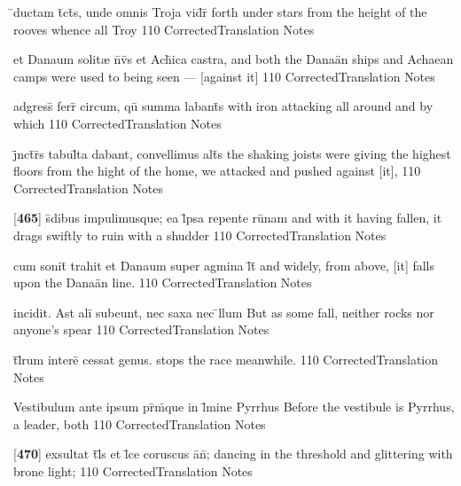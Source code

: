 \latline
  {\={}ductam t\={}ct\={\macron {\i}}s, unde omnis Troja vid\={}r\={\macron {\i}}}
  { forth under stars from the height of the rooves whence all Troy }
  {110}
  { CorrectedTranslation }
  { Notes }


\latline
  {et Danaum solit{\ae} n\={}v\={}s et Ach\={}ica castra,}
  { and both the Dana{\"a}n ships and Achaean camps were used to being seen --- [against it]   }
  {110}
  { CorrectedTranslation }
  { Notes }


\latline
  {adgress\={\macron {\i}} ferr\={} circum, qu\={} summa labant\={\macron {\i}}s}
  { with iron attacking all around and by which  }
  {110}
  { CorrectedTranslation }
  { Notes }


\latline
  {j\={}nct\={}r\={}s tabul\={}ta dabant, convellimus alt\={\macron {\i}}s}
  { the shaking joists were giving the highest floors from the hight of the home, we attacked and pushed against [it], }
  {110}
  { CorrectedTranslation }
  { Notes }


\latline
  {[\textbf{465}] s\={}dibus impulimusque; ea l\={}psa repente ru\={\macron {\i}}nam}
  { and with it having fallen, it drags swiftly to ruin with a shudder }
  {110}
  { CorrectedTranslation }
  { Notes }


\latline
  {cum sonit\={} trahit et Danaum super agmina l\={}t\={}}
  { and widely, from above, [it] falls upon the Dana{\"a}n line. }
  {110}
  { CorrectedTranslation }
  { Notes }


\latline
  {incidit. Ast ali\={\macron {\i}} subeunt, nec saxa nec \={}llum }
  { But as some fall, neither rocks nor anyone's spear  }
  {110}
  { CorrectedTranslation }
  { Notes }


\latline
  {t\={}l\={}rum intere\={} cessat genus.}
  { stops the race meanwhile. }
  {110}
  { CorrectedTranslation }
  { Notes }


\latline
  {Vestibulum ante ipsum pr\={\macron {\i}}m\={}que in l\={\macron {\i}}mine Pyrrhus}
  { Before the vestibule is Pyrrhus, a leader, both }
  {110}
  { CorrectedTranslation }
  { Notes }


\latline
  {[\textbf{470}] exsultat t\={}l\={\macron {\i}}s et l\={}ce coruscus a\={}n\={};}
  { dancing in the threshold and glittering with brone light; }
  {110}
  { CorrectedTranslation }
  { Notes }



